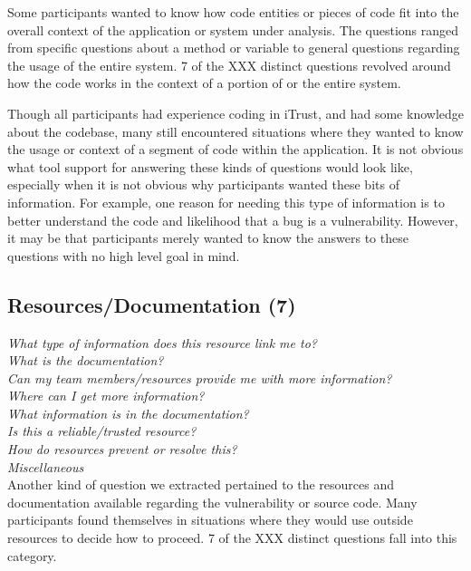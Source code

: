 \documentclass[conference]{IEEEtran}
\begin{document}
Some participants wanted to know how code entities or pieces of code fit into the overall context of the application or system under analysis. The questions ranged from specific questions about a method or variable to general questions regarding the usage of the entire system. 7 of the XXX distinct questions revolved around how the code works in the context of a portion of or the entire system.


Though all participants had experience coding in iTrust, and had some knowledge about the codebase, many still encountered situations where they wanted to know the usage or context of a segment of code within the application. It is not obvious what tool support for answering these kinds of questions would look like, especially when it is not obvious why participants wanted these bits of information. For example, one reason for needing this type of information is to  better understand the code and likelihood that a bug is a vulnerability. However, it may be that participants merely wanted to know the answers to these questions with no high level goal in mind.


\noindent\subsection{\textbf{Resources/Documentation (7)}}

\noindent\emph{What type of information does this resource link me to?} \\
\emph{What is the documentation?} \\
\emph{Can my team members/resources provide me with more information?} \\
\emph{Where can I get more information?} \\
\emph{What information is in the documentation?} \\
\emph{Is this a reliable/trusted resource?} \\
\emph{How do resources prevent or resolve this?} \\
\emph{Miscellaneous} \\

Another kind of question we extracted pertained to the resources and documentation available regarding the vulnerability or source code. Many participants found themselves in situations where they would use outside resources to decide how to proceed. 7 of the XXX distinct questions fall into this category. 
\end{document}

